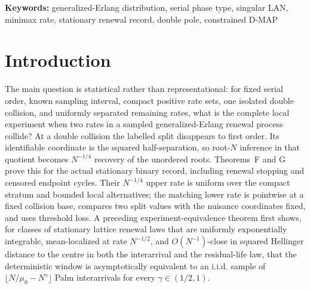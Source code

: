 \begin{abstract}
The underlying killed-reset D-MAP makes the visible process renewal but does
not make its hidden representation identifiable.  We retain the explicit
two-state Palm law, weak-equivalence cone intersection, and fixed-setting
record tools as population and inferential complements.  Three visible
inclusion probabilities give a rational inverse to \((p+s,ps)\).  This
three-inclusion formula is presented as a candidate original result pending
complete reduction against canonical DMAP2 coordinates; it identifies the
unordered pair, not a labelled realization.  The pure serial population
inverse remains a finite-coordinate sampled-tail specialization of the
generalized-Erlang and Coxian representation theory of He--Zhang.  Supplementary
calculations are separated from the stationary collision theorem.
For a two-state D-MAP whose transition kernel is irreducible, whose click
intensities are positive in both states, and whose stationary click rate lies
strictly between \(0\) and \(1\), we also characterize the renewal boundary:
apart from two Bernoulli degeneracies, the visible record is renewal exactly
when the normalized post-click law is independent of the pre-click state.
\end{abstract}

\noindent\textbf{Keywords:} generalized-Erlang distribution, serial phase
type, singular LAN, minimax rate, stationary renewal record, double pole,
constrained D-MAP

\section{Introduction}

The main question is statistical rather than representational: for fixed
serial order, known sampling interval, compact positive rate sets, one
isolated double collision, and uniformly separated remaining rates, what is
the complete local experiment when two rates in a sampled generalized-Erlang
renewal process collide?  At a double collision
the labelled split disappears to first order.  Its identifiable coordinate is
the squared half-separation, so root-\(N\) inference in that quotient becomes
\(N^{-1/4}\) recovery of the unordered roots.  Theorems~F and G prove this for
the actual stationary binary record, including renewal stopping and censored
endpoint cycles.  Their \(N^{-1/4}\) upper rate is uniform over the compact
stratum and bounded local alternatives; the matching lower rate is pointwise
at a fixed collision base, compares two split values with the nuisance
coordinates fixed, and uses threshold loss.  A preceding
experiment-equivalence theorem first shows, for classes of
stationary lattice renewal laws that are uniformly exponentially integrable,
mean-localized at rate \(N^{-1/2}\), and \(O(N^{-1})\)-close in squared
Hellinger distance to the centre in both the interarrival and the
residual-life law, that the
deterministic window is asymptotically equivalent to an i.i.d. sample of
\(\lfloor N/\mu_0-N^\gamma\rfloor\) Palm interarrivals for every
\(\gamma\in(1/2,1)\).


